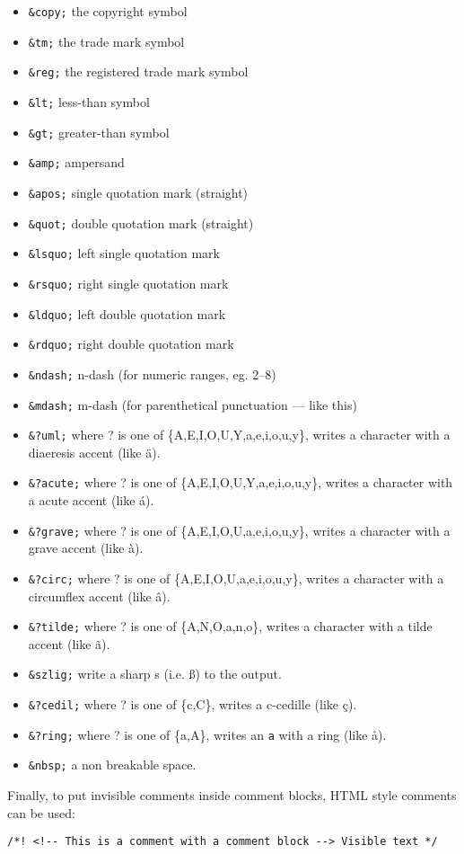 \begin{itemize}
\item {\tt \&copy;} the copyright symbol \item {\tt \&tm;} the trade mark symbol \item {\tt \&reg;} the registered trade mark symbol \item {\tt \&lt;} less-than symbol \item {\tt \&gt;} greater-than symbol \item {\tt \&amp;} ampersand \item {\tt \&apos;} single quotation mark (straight) \item {\tt \&quot;} double quotation mark (straight) \item {\tt \&lsquo;} left single quotation mark \item {\tt \&rsquo;} right single quotation mark \item {\tt \&ldquo;} left double quotation mark \item {\tt \&rdquo;} right double quotation mark \item {\tt \&ndash;} n-dash (for numeric ranges, eg. 2--8) \item {\tt \&mdash;} m-dash (for parenthetical punctuation --- like this) \item {\tt \&?uml;} where ? is one of \{A,E,I,O,U,Y,a,e,i,o,u,y\}, writes a character with a diaeresis accent (like \"{a}). \item {\tt \&?acute;} where ? is one of \{A,E,I,O,U,Y,a,e,i,o,u,y\}, writes a character with a acute accent (like \'{a}). \item {\tt \&?grave;} where ? is one of \{A,E,I,O,U,a,e,i,o,u,y\}, writes a character with a grave accent (like \`{a}). \item {\tt \&?circ;} where ? is one of \{A,E,I,O,U,a,e,i,o,u,y\}, writes a character with a circumflex accent (like \^{a}). \item {\tt \&?tilde;} where ? is one of \{A,N,O,a,n,o\}, writes a character with a tilde accent (like \~{a}). \item {\tt \&szlig;} write a sharp s (i.e. {\ss}) to the output. \item {\tt \&?cedil;} where ? is one of \{c,C\}, writes a c-cedille (like \c{c}). \item {\tt \&?ring;} where ? is one of \{a,A\}, writes an {\tt a} with a ring (like \aa). \item {\tt \&nbsp;} a non breakable space. \end{itemize}


Finally, to put invisible comments inside comment blocks, HTML style comments can be used: 

\footnotesize\begin{verbatim}
/*! <!-- This is a comment with a comment block --> Visible text */
\end{verbatim}
\normalsize
 